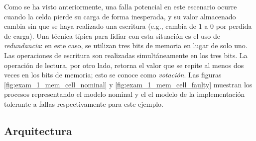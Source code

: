 Como se ha visto anteriormente, una falla potencial en este escenario ocurre cuando la celda pierde su carga de forma inesperada, y su valor almacenado cambia sin que se haya realizado una escritura (e.g., cambia de $1$ a $0$ por perdida de carga). Una técnica típica para lidiar con esta situación es el uso de \emph{redundancia}: 
en este caso, se utilizan tres bits de memoria en lugar de solo uno. Las operaciones de escritura son realizadas simultáneamente en los tres bits. 
La operación de lectura, por otro lado, retorna el valor que se repite al menos dos veces en los bits de memoria; esto se conoce como \emph{votación}. 
    Las figuras \ref{fig:exam_1_mem_cell_nominal} y \ref{fig:exam_1_mem_cell_faulty} muestran los procesos representando el modelo nominal y el el modelo de la implementación tolerante a fallas respectivamente para este ejemplo. 

\subsection{Arquitectura}

